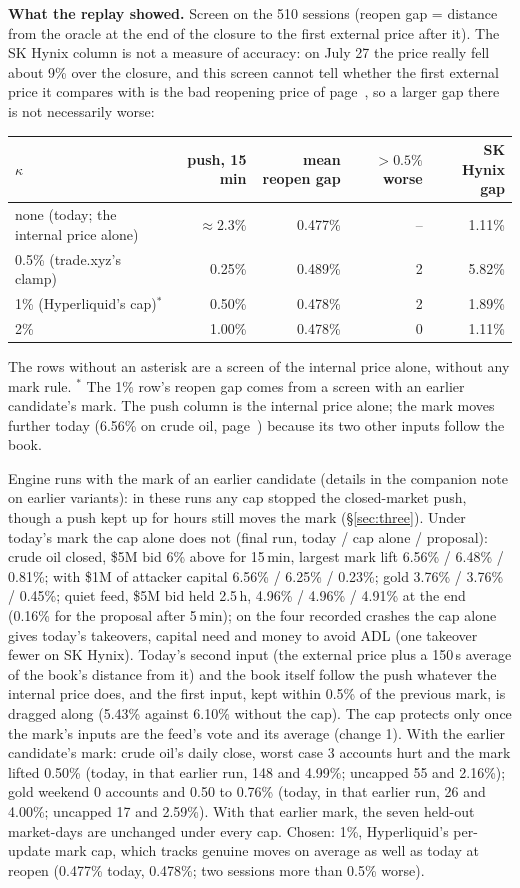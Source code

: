 \documentclass[10.5pt,a4paper]{article}
\newcommand{\res}[1]{\par\textbf{What the replay showed.} #1\par}
\begin{document}
\res{Screen on the 510 sessions (reopen gap = distance from the oracle at the end of the closure to the first external price after it). The SK Hynix column is not a measure of accuracy: on July 27 the price really fell about 9\% over the closure, and this screen cannot tell whether the first external price it compares with is the bad reopening price of page~\pageref{sec:skhx}, so a larger gap there is not necessarily worse:\par\begin{tabular}{@{}lrrrr@{}}
\toprule
$\kappa$ & push, 15 min & mean reopen gap & $>0.5\%$ worse & SK Hynix gap\\
\midrule
none (today; the internal price alone) & $\approx 2.3\%$ & 0.477\% & -- & 1.11\%\\
0.5\% (trade.xyz's clamp) & 0.25\% & 0.489\% & 2 & 5.82\%\\
1\% (Hyperliquid's cap)$^*$ & 0.50\% & 0.478\% & 2 & 1.89\%\\
2\% & 1.00\% & 0.478\% & 0 & 1.11\%\\
\bottomrule
\end{tabular}\par
The rows without an asterisk are a screen of the internal price alone, without any mark rule. $^*$ The 1\% row's reopen gap comes from a screen with an earlier candidate's mark. The push column is the internal price alone; the mark moves further today (6.56\% on crude oil, page~\pageref{sec:notlive}) because its two other inputs follow the book.\par
Engine runs with the mark of an earlier candidate (details in the companion note on earlier variants): in these runs any cap stopped the closed-market push, though a push kept up for hours still moves the mark (\S\ref{sec:three}). Under today's mark the cap alone does not (final run, today / cap alone / proposal): crude oil closed, \$5M bid 6\% above for 15\,min, largest mark lift 6.56\% / 6.48\% / 0.81\%; with \$1M of attacker capital 6.56\% / 6.25\% / 0.23\%; gold 3.76\% / 3.76\% / 0.45\%; quiet feed, \$5M bid held 2.5\,h, 4.96\% / 4.96\% / 4.91\% at the end (0.16\% for the proposal after 5\,min); on the four recorded crashes the cap alone gives today's takeovers, capital need and money to avoid ADL (one takeover fewer on SK Hynix). Today's second input (the external price plus a 150\,s average of the book's distance from it) and the book itself follow the push whatever the internal price does, and the first input, kept within 0.5\% of the previous mark, is dragged along (5.43\% against 6.10\% without the cap). The cap protects only once the mark's inputs are the feed's vote and its average (change 1). With the earlier candidate's mark: crude oil's daily close, worst case 3 accounts hurt and the mark lifted 0.50\% (today, in that earlier run, 148 and 4.99\%; uncapped 55 and 2.16\%); gold weekend 0 accounts and 0.50 to 0.76\% (today, in that earlier run, 26 and 4.00\%; uncapped 17 and 2.59\%). With that earlier mark, the seven held-out market-days are unchanged under every cap. Chosen: 1\%, Hyperliquid's per-update mark cap, which tracks genuine moves on average as well as today at reopen (0.477\% today, 0.478\%; two sessions more than 0.5\% worse).}
\end{document}
